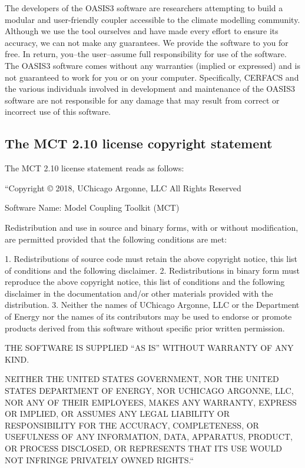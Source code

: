 The developers of the OASIS3 software are researchers attempting to
build a modular and user-friendly coupler accessible to the climate
modelling community. Although we use the tool ourselves and have made
every effort to ensure its accuracy, we can not make any
guarantees. We provide the software to you for free. In return,
you--the user--assume full responsibility for use of the software. The
OASIS3 software comes without any warranties (implied or expressed) and
is not guaranteed to work for you or on your computer. Specifically,
CERFACS and the various individuals involved in development and
maintenance of the OASIS3 software are not responsible for any damage
that may result from correct or incorrect use of this software.

\subsection{The MCT 2.10 license copyright statement}
\label{sec_MCT}

The MCT 2.10 license statement reads as follows:

 ``Copyright © 2018, UChicago Argonne, LLC All Rights Reserved

Software Name: Model Coupling Toolkit (MCT)

Redistribution and use in source and binary forms, with or without
modification, are permitted provided that the following conditions are met:

1. Redistributions of source code must retain the above copyright notice, this 
list of conditions and the following disclaimer.
2. Redistributions in binary form must reproduce the above copyright notice, 
this list of conditions and the following disclaimer in the documentation
and/or other materials provided with the distribution.
3. Neither the names of UChicago Argonne, LLC or the Department of Energy nor 
the names of its contributors may be used to endorse or promote products
derived from this software without specific prior written permission.

THE SOFTWARE IS SUPPLIED ``AS IS'' WITHOUT WARRANTY OF ANY KIND.
 
NEITHER THE UNITED STATES GOVERNMENT, NOR THE UNITED STATES DEPARTMENT OF 
ENERGY, NOR UCHICAGO ARGONNE, LLC, NOR ANY OF THEIR EMPLOYEES, MAKES ANY 
WARRANTY, EXPRESS OR IMPLIED, OR ASSUMES ANY LEGAL LIABILITY OR RESPONSIBILITY 
FOR THE ACCURACY, COMPLETENESS, OR USEFULNESS OF ANY INFORMATION, DATA, 
APPARATUS, PRODUCT, OR PROCESS DISCLOSED, OR REPRESENTS THAT ITS USE WOULD 
NOT INFRINGE PRIVATELY OWNED RIGHTS.``


